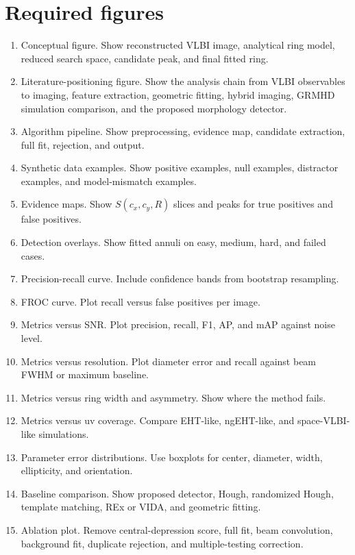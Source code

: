 \documentclass[11pt]{article}
\begin{document}
\section{Required figures}

\begin{enumerate}[leftmargin=*]
    \item Conceptual figure. Show reconstructed VLBI image, analytical ring model, reduced search space, candidate peak, and final fitted ring.
    \item Literature-positioning figure. Show the analysis chain from VLBI observables to imaging, feature extraction, geometric fitting, hybrid imaging, GRMHD simulation comparison, and the proposed morphology detector.
    \item Algorithm pipeline. Show preprocessing, evidence map, candidate extraction, full fit, rejection, and output.
    \item Synthetic data examples. Show positive examples, null examples, distractor examples, and model-mismatch examples.
    \item Evidence maps. Show $S(c_x,c_y,R)$ slices and peaks for true positives and false positives.
    \item Detection overlays. Show fitted annuli on easy, medium, hard, and failed cases.
    \item Precision-recall curve. Include confidence bands from bootstrap resampling.
    \item FROC curve. Plot recall versus false positives per image.
    \item Metrics versus SNR. Plot precision, recall, F1, AP, and mAP against noise level.
    \item Metrics versus resolution. Plot diameter error and recall against beam FWHM or maximum baseline.
    \item Metrics versus ring width and asymmetry. Show where the method fails.
    \item Metrics versus uv coverage. Compare EHT-like, ngEHT-like, and space-VLBI-like simulations.
    \item Parameter error distributions. Use boxplots for center, diameter, width, ellipticity, and orientation.
    \item Baseline comparison. Show proposed detector, Hough, randomized Hough, template matching, REx or VIDA, and geometric fitting.
    \item Ablation plot. Remove central-depression score, full fit, beam convolution, background fit, duplicate rejection, and multiple-testing correction.

\end{enumerate}
\end{document}
